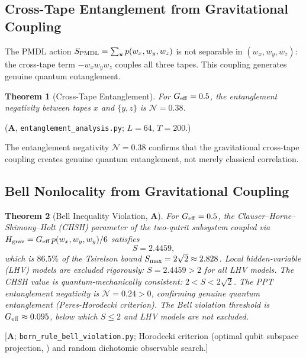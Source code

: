 \documentclass[11pt]{article}
\newtheorem{theorem}{Theorem}[section]
\theoremstyle{remark}
\newcommand{\CatA}{\textbf{A}}
\newcommand{\PMDL}{S_{\rm PMDL}}
\begin{document}
\subsection{Cross-Tape Entanglement from Gravitational Coupling}

The PMDL action $\PMDL = \sum_{\bf x} p(w_x,w_y,w_z)$ is not separable
in $(w_x, w_y, w_z)$: the cross-tape term $-w_x w_y w_z$ couples all three
tapes. This coupling generates genuine quantum entanglement.

\begin{theorem}[Cross-Tape Entanglement]
For $G_{\rm eff} = 0.5$, the entanglement negativity between tapes $x$
and $\{y,z\}$ is $\mathcal{N} = 0.38$.
\end{theorem}
($\CatA$, \texttt{entanglement\_analysis.py};
$L = 64$, $T = 200$.)

The entanglement negativity $\mathcal{N} = 0.38$ confirms that the
gravitational cross-tape coupling creates genuine quantum entanglement, not
merely classical correlation.

\subsection{Bell Nonlocality from Gravitational Coupling}
\label{sec:bell}

\begin{theorem}[Bell Inequality Violation, $\CatA$]
\label{thm:bell}
For $G_{\rm eff} = 0.5$, the Clauser--Horne--Shimony--Holt (CHSH) parameter
of the two-qutrit subsystem coupled via $H_{\rm grav} = G_{\rm eff}\,p(w_x,w_y,w_y)/6$
satisfies
\begin{equation}
  S = 2.4459,
\end{equation}
which is $86.5\%$ of the Tsirelson bound $S_{\rm max} = 2\sqrt{2} \approx 2.828$.
Local hidden-variable (LHV) models are excluded rigorously: $S = 2.4459 > 2$
for all LHV models.
The CHSH value is quantum-mechanically consistent: $2 < S < 2\sqrt{2}$.
The PPT entanglement negativity is $\mathcal{N} = 0.24 > 0$, confirming
genuine quantum entanglement (Peres-Horodecki criterion).
The Bell violation threshold is $G_{\rm eff} \approx 0.095$, below which
$S \leq 2$ and LHV models are not excluded.
\end{theorem}
[$\CatA$; \texttt{born\_rule\_bell\_violation.py};
Horodecki criterion (optimal qubit subspace projection, \cite{Horodecki1995}) and
random dichotomic observable search.]
\end{document}
